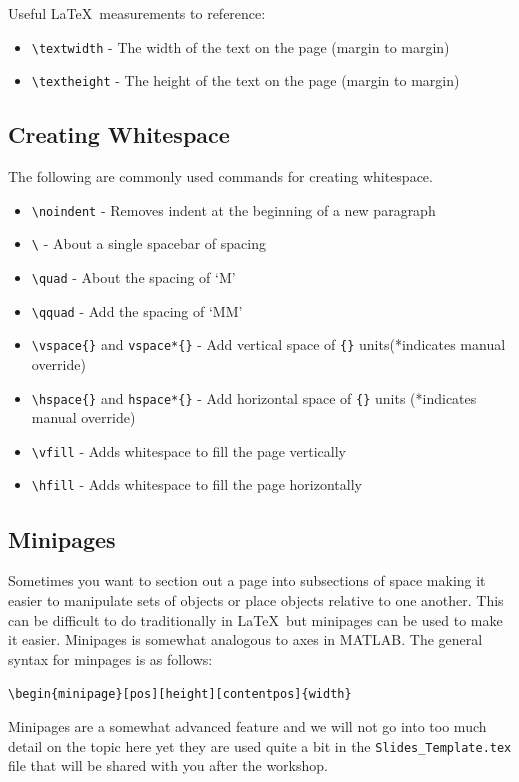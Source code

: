 \documentclass[]{article}%
\newcommand{\bs}{\textbackslash}
\newcommand{\TT}[1]{\texttt{#1}}
\newcommand{\tpc}{\textperiodcentered}
\theoremstyle{definition}
\begin{document}
	\noindent Useful \LaTeX\ measurements to reference:
	\begin{itemize}
		\item \TT{\bs textwidth} - The width of the text on the page (margin to margin)
		\item \TT{\bs textheight} - The height of the text on the page (margin to margin)
	\end{itemize}
	
	\subsection{Creating Whitespace}
	The following are commonly used commands for creating whitespace.
	
	\begin{itemize}
		\item \TT{\bs noindent} - Removes indent at the beginning of a new paragraph
		\item \TT{\bs} - About a single spacebar of spacing
		\item \TT{\bs quad} - About the spacing of `M'
		\item \TT{\bs qquad} - Add the spacing of `MM'
		\item \TT{\bs vspace\{\tpc\}} and \TT{vspace*\{\tpc\}} - Add vertical space of \TT{\{\tpc\}} units(*indicates manual override)
		\item \TT{\bs hspace\{\tpc\}} and \TT{hspace*\{\tpc\}} - Add horizontal space of \TT{\{\tpc\}} units (*indicates manual override)
		\item \TT{\bs vfill} - Adds whitespace to fill the page vertically
		\item \TT{\bs hfill} - Adds whitespace to fill the page horizontally
	\end{itemize}
	
	\subsection{Minipages}
	Sometimes you want to section out a page into subsections of space making it easier to manipulate sets of objects or place objects relative to one another.
	This can be difficult to do traditionally in \LaTeX\ but minipages can be used to make it easier.
	Minipages is somewhat analogous to axes in MATLAB.
	The general syntax for minpages is as follows:
	\begin{center}
		\TT{\bs begin\{minipage\}[pos][height][contentpos]\{width\}}\\
	\end{center}
	Minipages are a somewhat advanced feature and we will not go into too much detail on the topic here yet they are used quite a bit in the \TT{Slides\_Template.tex} file that will be shared with you after the workshop.
	
\end{document}
